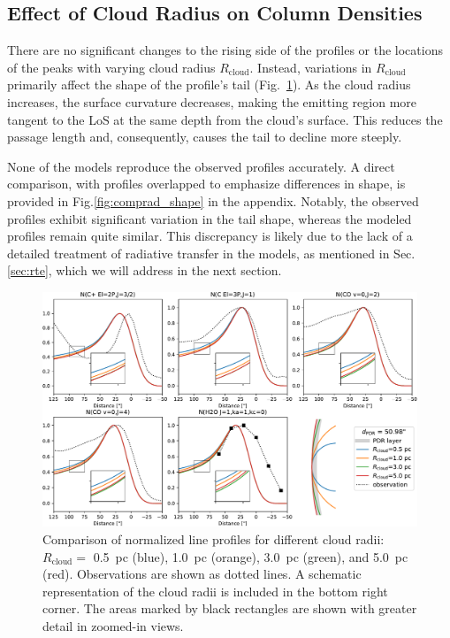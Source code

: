 \documentclass[12pt,a4paper]{article}
\newcommand{\mr}{\mathrm}
\begin{document}
\subsection{Effect of Cloud Radius on Column Densities} \label{sec:comprad}

There are no significant changes to the rising side of the profiles or the locations of the peaks with varying cloud radius $R_\mr{cloud}$. Instead, variations in $R_\mr{cloud}$ primarily affect the shape of the profile's tail (Fig.~\ref{fig:comprad}). As the cloud radius increases, the surface curvature decreases, making the emitting region more tangent to the LoS at the same depth from the cloud's surface. This reduces the passage length and, consequently, causes the tail to decline more steeply.

None of the models reproduce the observed profiles accurately. A direct comparison, with profiles overlapped to emphasize differences in shape, is provided in Fig.\ref{fig:comprad_shape} in the appendix. Notably, the observed profiles exhibit significant variation in the tail shape, whereas the modeled profiles remain quite similar. This discrepancy is likely due to the lack of a detailed treatment of radiative transfer in the models, as mentioned in Sec.\ref{sec:rte}, which we will address in the next section.

\begin{figure}[h]
    \centering
    \includegraphics[width=\textwidth,keepaspectratio]{comp_cloud_radius.pdf}
    \caption{Comparison of normalized line profiles for different cloud radii: $R_\mr{cloud} = $ \qty{0.5}{pc} (blue), \qty{1.0}{pc} (orange), \qty{3.0}{pc} (green), and \qty{5.0}{pc} (red). Observations are shown as dotted lines. A schematic representation of the cloud radii is included in the bottom right corner. The areas marked by black rectangles are shown with greater detail in zoomed-in views.} \label{fig:comprad}
\end{figure}
\end{document}
